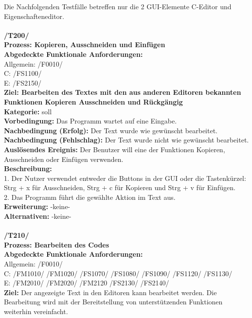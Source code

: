 \documentclass[a4paper]{scrreprt}
\begin{document}
Die Nachfolgenden Testfälle betreffen nur die 2 GUI-Elemente C-Editor und Eigenschafteneditor. \\\\
\textbf{/T200/} \\
\textbf{Prozess: Kopieren, Ausschneiden und Einfügen} \\
\textbf{Abgedeckte Funktionale Anforderungen:}\\
Allgemein: /F0010/ \\
C: /FS1100/ \\
E: /FS2150/ \\
\textbf{Ziel: Bearbeiten des Textes mit den aus anderen Editoren bekannten Funktionen Kopieren Ausschneiden und Rückgängig} \\
\textbf{Kategorie:} soll\\
\textbf{Vorbedingung:} Das Programm wartet auf eine Eingabe.\\
\textbf{Nachbedingung (Erfolg):} Der Text wurde wie gewünscht bearbeitet.\\
\textbf{Nachbedingung (Fehlschlag):} Der Text wurde nicht wie gewünscht bearbeitet.\\
\textbf{Auslösendes Ereignis:} Der Benutzer will eine der Funktionen Kopieren, Ausschneiden oder Einfügen verwenden.\\
\textbf{Beschreibung:} \\
1. Der Nutzer verwendet entweder die Buttons in der GUI oder die Tastenkürzel:\\
Strg + x für Ausschneiden, Strg + c für Kopieren und Strg + v für Einfügen. \\
2. Das Programm führt die gewählte Aktion im Text aus.\\
\textbf {Erweiterung:} -keine- \\
\textbf {Alternativen:} -keine- \\\\
\textbf{/T210/} \\
\textbf{Prozess: Bearbeiten des Codes} \\
\textbf{Abgedeckte Funktionale Anforderungen:}\\
Allgemein: /F0010/  \\
C: /FM1010/ /FM1020/ /FS1070/ /FS1080/ /FS1090/ /FS1120/ /FS1130/   \\
E: /FM2010/ /FM2020/ /FM2120 /FS2130/ /FS2140/ \\
\textbf{Ziel:} Der angezeigte Text in den Editoren kann bearbeitet werden. Die Bearbeitung wird mit der Bereitstellung von unterstützenden Funktionen weiterhin vereinfacht.\\
\end{document}
